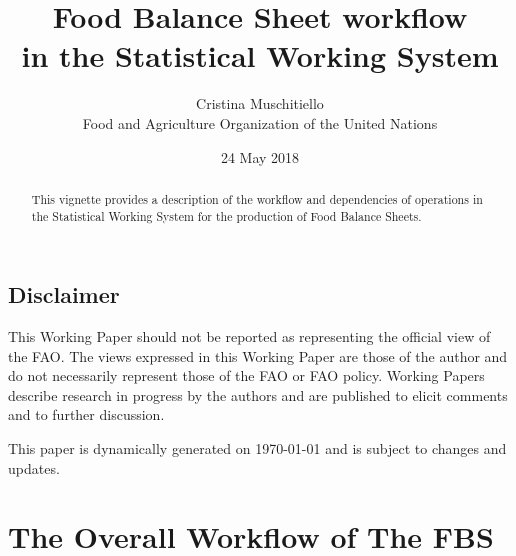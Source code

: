 \documentclass[]{article}
\title{Food Balance Sheet workflow\\
in the Statistical Working System}
\author{Cristina Muschitiello\\
Food and Agriculture Organization of the United Nations}
\date{24 May 2018}
\begin{document}
\maketitle
\begin{abstract}
This vignette provides a description of the workflow and dependencies of
operations in the Statistical Working System for the production of Food
Balance Sheets.
\end{abstract}

{
\setcounter{tocdepth}{4}
\tableofcontents
}
\newpage

\listoftables

\listoffigures

\newpage

\subsection*{Disclaimer}\label{disclaimer}

This Working Paper should not be reported as representing the official
view of the FAO. The views expressed in this Working Paper are those of
the author and do not necessarily represent those of the FAO or FAO
policy. Working Papers describe research in progress by the authors and
are published to elicit comments and to further discussion.

This paper is dynamically generated on \today{} and is subject to
changes and updates.

\section*{The Overall Workflow of The
FBS}\label{the-overall-workflow-of-the-fbs}
\end{document}
